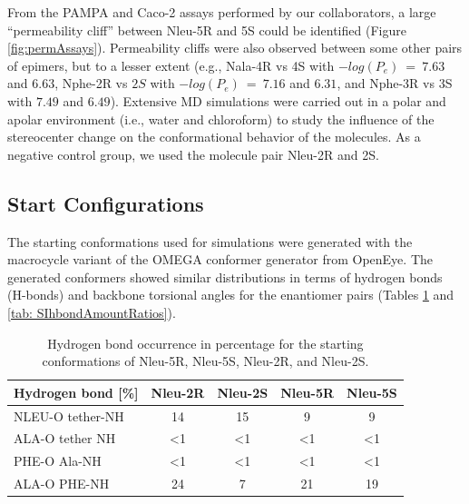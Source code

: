 From the PAMPA and Caco-2 assays performed by our collaborators, a large ``permeability cliff''  between Nleu-5R and 5S could be identified (Figure \ref{fig:permAssays}). Permeability cliffs were also observed between some other pairs of epimers, but to a lesser extent (e.g., Nala-4R vs 4S with $−log(P_e)$~=~$7.63$ and $6.63$, Nphe-2R vs $2S$ with $−log(P_e)$~=~$7.16$ and $6.31$, and Nphe-3R vs 3S with $7.49$ and $6.49$). 
Extensive MD simulations were carried out in a polar and apolar environment (i.e., water and chloroform) to study the influence of the stereocenter change on the conformational behavior of the molecules. As a negative control group, we used the molecule pair Nleu-2R and 2S. 

\FloatBarrier

\subsection{Start Configurations} 
The starting conformations used for simulations were generated with  the macrocycle variant of the OMEGA conformer generator from OpenEye.  \cite{Hawkins2012, Hawkins2010, Poongavanam2018}
The generated conformers showed similar distributions in terms of hydrogen bonds (H-bonds) and backbone torsional angles for the enantiomer pairs (Tables \ref{tab: SIhbondRatios} and \ref{tab: SIhbondAmountRatios}).

\begin{table}[h!]
\centering
\caption{Hydrogen bond occurrence in percentage for the starting conformations of Nleu-5R, Nleu-5S, Nleu-2R, and Nleu-2S.}
\label{tab: SIhbondRatios}
  \begin{adjustbox}{max width=\textwidth}
  \begin{tabular}{lcccc}
Hydrogen bond {[}\%{]} & Nleu-2R      & Nleu-2S      & Nleu-5R      & Nleu-5S      \\
\hline
NLEU-O tether-NH       & 14         & 15         &  9           & 9        \\
ALA-O tether NH        & \textless{}1 & \textless{}1  & \textless{}1  & \textless{}1 \\
PHE-O Ala-NH           & \textless{}1 & \textless{}1 & \textless{}1  & \textless{}1 \\
ALA-O PHE-NH           & 24           & 7            & 21 & 19 \\
    \hline
\end{tabular}%
\end{adjustbox}
\end{table}



